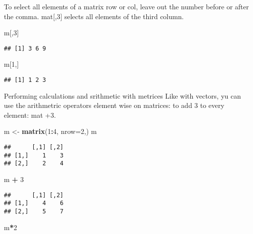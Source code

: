 \documentclass[
]{article}
\newenvironment{Shaded}{\begin{snugshade}}{\end{snugshade}}
\newcommand{\DataTypeTok}[1]{\textcolor[rgb]{0.13,0.29,0.53}{#1}}
\newcommand{\DecValTok}[1]{\textcolor[rgb]{0.00,0.00,0.81}{#1}}
\newcommand{\KeywordTok}[1]{\textcolor[rgb]{0.13,0.29,0.53}{\textbf{#1}}}
\newcommand{\NormalTok}[1]{#1}
\newcommand{\OperatorTok}[1]{\textcolor[rgb]{0.81,0.36,0.00}{\textbf{#1}}}
\newcommand{\StringTok}[1]{\textcolor[rgb]{0.31,0.60,0.02}{#1}}
\begin{document}
To select all elements of a matrix row or col, leave out the number
before or after the comma. mat{[},3{]} selects all elements of the third
column.

\begin{Shaded}
\begin{Highlighting}[]
\NormalTok{m[,}\DecValTok{3}\NormalTok{]}
\end{Highlighting}
\end{Shaded}

\begin{verbatim}
## [1] 3 6 9
\end{verbatim}

\begin{Shaded}
\begin{Highlighting}[]
\NormalTok{m[}\DecValTok{1}\NormalTok{,]}
\end{Highlighting}
\end{Shaded}

\begin{verbatim}
## [1] 1 2 3
\end{verbatim}

Performing calculations and srithmetic with metrices Like with vectors,
yu can use the arithmetric operators element wise on matrices: to add 3
to every element: mat +3.

\begin{Shaded}
\begin{Highlighting}[]
\NormalTok{m <-}\StringTok{ }\KeywordTok{matrix}\NormalTok{(}\DecValTok{1}\OperatorTok{:}\DecValTok{4}\NormalTok{, }\DataTypeTok{nrow=}\DecValTok{2}\NormalTok{,)}
\NormalTok{m}
\end{Highlighting}
\end{Shaded}

\begin{verbatim}
##      [,1] [,2]
## [1,]    1    3
## [2,]    2    4
\end{verbatim}

\begin{Shaded}
\begin{Highlighting}[]
\NormalTok{m }\OperatorTok{+}\StringTok{ }\DecValTok{3}
\end{Highlighting}
\end{Shaded}

\begin{verbatim}
##      [,1] [,2]
## [1,]    4    6
## [2,]    5    7
\end{verbatim}

\begin{Shaded}
\begin{Highlighting}[]
\NormalTok{m}\OperatorTok{*}\DecValTok{2}
\end{Highlighting}
\end{Shaded}
\end{document}
